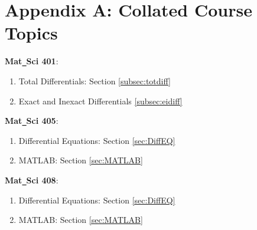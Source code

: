 \section{Appendix A: Collated Course Topics} \label{app:AppendixA}


\textbf{Mat\texttt{\_}Sci 401}: 
\begin{enumerate}
	\item Total Differentials: Section \ref{subsec:totdiff} 
	\item Exact and Inexact Differentials \ref{subsec:eidiff}
\end{enumerate}

\textbf{Mat\texttt{\_}Sci 405}: 
\begin{enumerate}
	\item Differential Equations: Section \ref{sec:DiffEQ}
	\item MATLAB: Section \ref{sec:MATLAB} 
\end{enumerate}

\textbf{Mat\texttt{\_}Sci 408}: 
\begin{enumerate}
	\item Differential Equations: Section \ref{sec:DiffEQ}
	\item MATLAB: Section \ref{sec:MATLAB} 
\end{enumerate}

